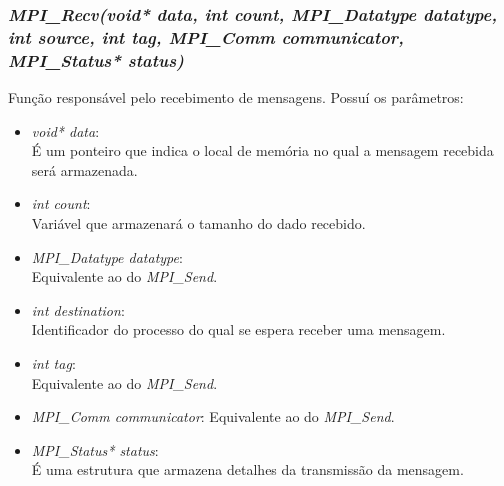 		\subsubsection{\normalsize \textit{MPI\_Recv(void* data, int count, MPI\_Datatype datatype, int source, int tag, MPI\_Comm communicator, MPI\_Status* status)}}\label{recv}
			Função responsável pelo recebimento de mensagens. Possuí os parâmetros:
			\begin{itemize}
				\item \textit{void* data}:\\
					É um ponteiro que indica o local de memória no qual a mensagem recebida será armazenada.
				
				\item \textit{int count}:\\
					Variável que armazenará o tamanho do dado recebido.
					
				\item \textit{MPI\_Datatype datatype}:\\
					Equivalente ao do \textit{MPI\_Send}.
					
				\item \textit{int destination}:\\
					Identificador do processo do qual se espera receber uma mensagem.
										
				\item \textit{int tag}:\\
					Equivalente ao do \textit{MPI\_Send}.
					
				\item \textit{MPI\_Comm communicator}:
					Equivalente ao do \textit{MPI\_Send}.
				
				\item \textit{MPI\_Status* status}:\\
					É uma estrutura que armazena detalhes da transmissão da mensagem.
			\end{itemize}
			